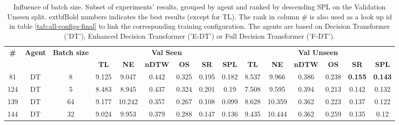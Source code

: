 \begin{table}
\centering
\caption{\label{tab:batch_test}Influence of batch size. Subset of experiments' results, grouped by agent and ranked by descending SPL on the Validation Unseen split. 	extbf{Bold} numbers indicates the best results (except for TL). The rank in column \# is also used as a look up id in table \ref{tab:all-configs-final} to link the corresponding training configuration.     \newline The agents are based on Decision Transformer ('DT'), Enhanced Decision Transformer ('E-DT') or Full Decision Transformer ('F-DT').}
\begin{tabular}{@{\hskip3pt}c@{\hskip3pt}c@{\hskip3pt}c@{\hskip3pt}c@{\hskip3pt}c@{\hskip3pt}c@{\hskip3pt}c@{\hskip3pt}c@{\hskip3pt}c@{\hskip3pt}c@{\hskip3pt}c@{\hskip3pt}c@{\hskip3pt}c@{\hskip3pt}c@{\hskip3pt}c}
\toprule
\textbf{\#} & \textbf{Agent} & \textbf{Batch size} & \multicolumn{6}{c}{\textbf{Val Seen}} & \multicolumn{6}{c}{\textbf{Val Unseen}} \\
 \textbf{~} &     \textbf{~} &          \textbf{~} &       \textbf{TL} &     \textbf{NE} &   \textbf{nDTW} &    \textbf{OS} &     \textbf{SR} &    \textbf{SPL} &         \textbf{TL} &     \textbf{NE} &   \textbf{nDTW} &     \textbf{OS} &     \textbf{SR} &    \textbf{SPL} \\
\midrule
         81 &             DT &                   8 &             9.125 &           9.047 &           0.442 &          0.325 &           0.195 &           0.182 &               8.537 &           9.966 &           0.386 &           0.238 &  \textbf{0.155} &  \textbf{0.143} \\
        124 &             DT &                   5 &             8.483 &           8.945 &           0.437 &          0.324 &           0.201 &            0.19 &               7.508 &           9.595 &           0.394 &           0.213 &           0.142 &           0.132 \\
        139 &             DT &                  64 &             9.177 &          10.242 &           0.357 &          0.267 &           0.108 &           0.099 &               8.628 &          10.359 &           0.362 &           0.223 &           0.137 &           0.122 \\
        144 &             DT &                  32 &             9.024 &           9.953 &           0.379 &          0.288 &           0.147 &           0.136 &               9.435 &          10.444 &           0.362 &           0.259 &           0.135 &            0.12 \\

\end{tabular}
\end{table}
